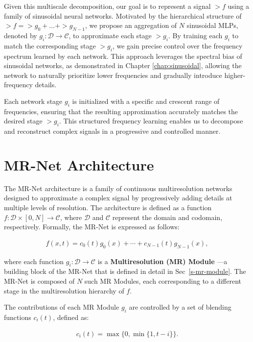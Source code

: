 Given this multiscale decomposition, our goal is to represent a signal $\gt{f}$ using a family of sinusoidal neural networks. Motivated by the hierarchical structure of $\gt{f}=\gt{g}_0+\dots+\gt{g}_{N-1}$, we propose an aggregation of $N$ sinusoidal MLPs, denoted by $g_i:\mathcal{D}\to \mathcal{C}$, to approximate each stage $\gt{g}_i$. By training each $g_i$ to match the corresponding stage $\gt{g}_i$, we gain precise control over the frequency spectrum learned by each network. This approach leverages the spectral bias of sinusoidal networks, as demonstrated in Chapter \ref{chap:sinusoidal}, allowing the network to naturally prioritize lower frequencies and gradually introduce higher-frequency details.

Each network stage $g_i$ is initialized with a specific and crescent range of frequencies, ensuring that the resulting approximation accurately matches the desired stage $\gt{g}_i$. This structured frequency learning enables us to decompose and reconstruct complex signals in a progressive and controlled manner.

\section{MR-Net Architecture}

The MR-Net architecture is a family of continuous multiresolution networks designed to approximate a complex signal by progressively adding details at multiple levels of resolution. The architecture is defined as a function \( f:\mathcal{D} \times [0,N] \to \mathcal{C} \), where \(\mathcal{D}\) and \(\mathcal{C}\) represent the domain and codomain, respectively. Formally, the MR-Net is expressed as follows:

\begin{align}\label{e-mrnet}
f(x,t) = c_0(t) g_0(x) + \cdots + c_{N-1}(t) g_{N-1}(x),
\end{align}

where each function \( g_i : \mathcal{D} \to \mathcal{C} \) is a \textbf{Multiresolution (MR) Module} —a building block of the MR-Net that is defined in detail in Sec~\ref{s-mr-module}. The MR-Net is composed of \( N \) such MR Modules, each corresponding to a different stage in the multiresolution hierarchy of \( f \). 

The contributions of each MR Module \( g_i \) are controlled by a set of blending functions \( c_i(t) \), defined as:

\begin{align}\label{e-control}
c_i(t) = \max \Big\{ 0, \min \big\{ 1, t - i \big\} \Big\}.
\end{align}

